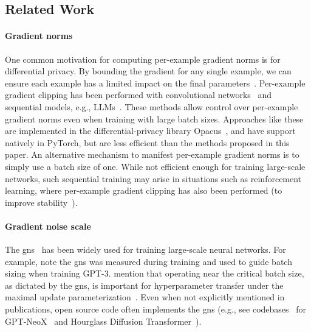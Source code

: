 \documentclass{article}
\begin{document}
\subsection{Related Work}\label{related-work}

\paragraph{Gradient norms}

One common motivation for computing per-example gradient norms is for
differential privacy.  By bounding the gradient for any single
example, we can ensure each example has a limited impact on the
final parameters~\citep{rochette2019efficient,li2022large}.
Per-example gradient clipping has been performed with convolutional
networks~\citep{rochette2019efficient} and sequential models, e.g.,
LLMs~\citep{li2022large}.
These methods allow control over per-example gradient norms even when
training with large batch sizes.  Approaches like these are
implemented in the differential-privacy library Opacus~\citep{opacus},
and have support natively in PyTorch, but are less efficient than the
methods proposed in this paper.
An alternative mechanism to manifest per-example gradient norms is to
simply use a batch size of one.  While not efficient enough for
training large-scale networks, such sequential training may arise in
situations such as reinforcement learning, where per-example gradient
clipping has also been performed (to improve
stability~\citep{wang2016dueling}).

\paragraph{Gradient noise scale}

The \acl{gns}~\citep{mccandlish2018empirical} has been widely used for
training large-scale neural networks.  For example,
\citet{brown2020language} note the \ac{gns} was measured during
training and used to guide batch sizing when training GPT-3\@.
\citet{dey2023cerebrasgpt} mention that operating near the critical
batch size, as dictated by the \ac{gns}, is important for
hyperparameter transfer under the maximal update
parameterization~\cite{yang2022mup}.
Even when not explicitly mentioned in publications, open source code
often implements the \ac{gns} (e.g., see
codebases~\cite{eleuther2024gptneox,crowson2024kdiffusion} for
GPT-NeoX~\cite{black2022gptneox} and Hourglass Diffusion
Transformer~\cite{crowson2024scalable}).
\end{document}
